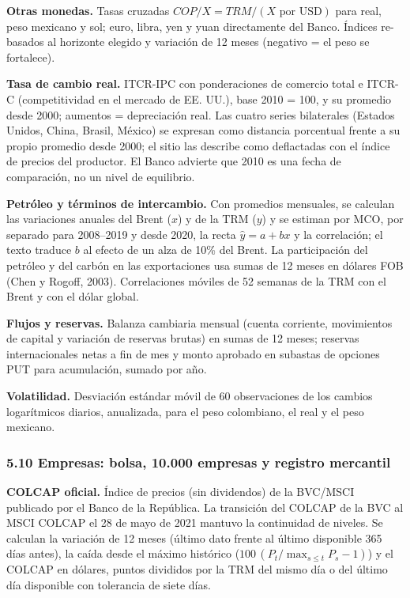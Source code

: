 \textbf{Otras monedas.} Tasas cruzadas
\(COP/X = TRM/(X\text{ por USD})\) para real, peso mexicano y sol; euro,
libra, yen y yuan directamente del Banco. Índices re-basados al
horizonte elegido y variación de 12 meses (negativo = el peso se
fortalece).

\textbf{Tasa de cambio real.} ITCR-IPC con ponderaciones de comercio
total e ITCR-C (competitividad en el mercado de EE. UU.), base 2010 =
100, y su promedio desde 2000; aumentos = depreciación real. Las cuatro
series bilaterales (Estados Unidos, China, Brasil, México) se expresan
como distancia porcentual frente a su propio promedio desde 2000; el
sitio las describe como deflactadas con el índice de precios del
productor. El Banco advierte que 2010 es una fecha de comparación, no un
nivel de equilibrio.

\textbf{Petróleo y términos de intercambio.} Con promedios mensuales, se
calculan las variaciones anuales del Brent (\(x\)) y de la TRM (\(y\)) y
se estiman por MCO, por separado para 2008--2019 y desde 2020, la recta
\(\hat y=a+bx\) y la correlación; el texto traduce \(b\) al efecto de un
alza de 10\% del Brent. La participación del petróleo y del carbón en
las exportaciones usa sumas de 12 meses en dólares FOB (Chen y Rogoff,
2003). Correlaciones móviles de 52 semanas de la TRM con el Brent y con
el dólar global.

\textbf{Flujos y reservas.} Balanza cambiaria mensual (cuenta corriente,
movimientos de capital y variación de reservas brutas) en sumas de 12
meses; reservas internacionales netas a fin de mes y monto aprobado en
subastas de opciones PUT para acumulación, sumado por año.

\textbf{Volatilidad.} Desviación estándar móvil de 60 observaciones de
los cambios logarítmicos diarios, anualizada, para el peso colombiano,
el real y el peso mexicano.

\hypertarget{empresas-bolsa-10.000-empresas-y-registro-mercantil}{%
\subsubsection{5.10 Empresas: bolsa, 10.000 empresas y registro
mercantil}\label{empresas-bolsa-10.000-empresas-y-registro-mercantil}}

\textbf{COLCAP oficial.} Índice de precios (sin dividendos) de la
BVC/MSCI publicado por el Banco de la República. La transición del
COLCAP de la BVC al MSCI COLCAP el 28 de mayo de 2021 mantuvo la
continuidad de niveles. Se calculan la variación de 12 meses (último
dato frente al último disponible 365 días antes), la caída desde el
máximo histórico (\(100\,(P_t/\max_{s\le t}P_s-1)\)) y el COLCAP en
dólares, puntos divididos por la TRM del mismo día o del último día
disponible con tolerancia de siete días.

